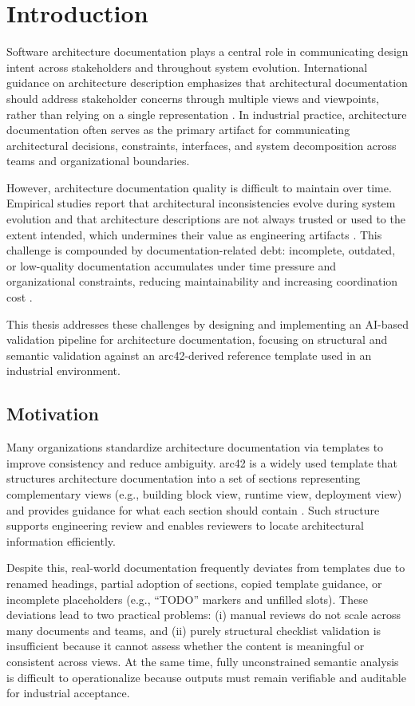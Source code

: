 \section{Introduction}
Software architecture documentation plays a central role in communicating design intent across stakeholders and throughout system evolution. International guidance on architecture description emphasizes that architectural documentation should address stakeholder concerns through multiple views and viewpoints, rather than relying on a single representation \cite{iso42010}. In industrial practice, architecture documentation often serves as the primary artifact for communicating architectural decisions, constraints, interfaces, and system decomposition across teams and organizational boundaries.

However, architecture documentation quality is difficult to maintain over time. Empirical studies report that architectural inconsistencies evolve during system evolution and that architecture descriptions are not always trusted or used to the extent intended, which undermines their value as engineering artifacts \cite{wohlrab_inconsistencies}. This challenge is compounded by documentation-related debt: incomplete, outdated, or low-quality documentation accumulates under time pressure and organizational constraints, reducing maintainability and increasing coordination cost \cite{documentation_debt}.

This thesis addresses these challenges by designing and implementing an AI-based validation pipeline for architecture documentation, focusing on structural and semantic validation against an arc42-derived reference template used in an industrial environment.

\subsection{Motivation}
Many organizations standardize architecture documentation via templates to improve consistency and reduce ambiguity. arc42 is a widely used template that structures architecture documentation into a set of sections representing complementary views (e.g., building block view, runtime view, deployment view) and provides guidance for what each section should contain \cite{arc42}. Such structure supports engineering review and enables reviewers to locate architectural information efficiently.

Despite this, real-world documentation frequently deviates from templates due to renamed headings, partial adoption of sections, copied template guidance, or incomplete placeholders (e.g., ``TODO'' markers and unfilled slots). These deviations lead to two practical problems: (i) manual reviews do not scale across many documents and teams, and (ii) purely structural checklist validation is insufficient because it cannot assess whether the content is meaningful or consistent across views. At the same time, fully unconstrained semantic analysis is difficult to operationalize because outputs must remain verifiable and auditable for industrial acceptance.

